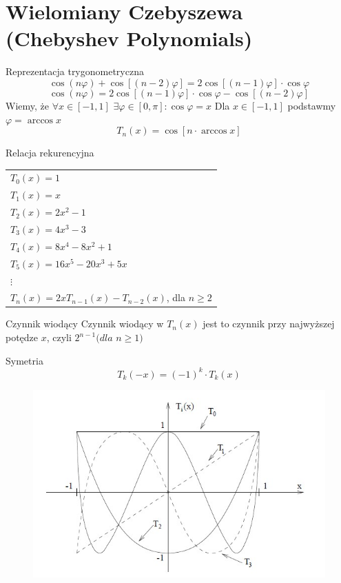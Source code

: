 \section{Wielomiany Czebyszewa (Chebyshev Polynomials)}
\begin{frame}{Reprezentacja trygonometryczna}
	$$\cos(n\varphi)+\cos[(n-2)\varphi] = 2\cos[(n-1)\varphi] \cdot \cos \varphi$$
    $$\cos(n\varphi) = 2\cos[(n-1)\varphi] \cdot \cos \varphi - \cos[(n-2)\varphi]$$
    Wiemy, że $\forall x \in [-1,1]$ $\exists \varphi \in [0,\pi]: \cos \varphi = x$ \newline
    Dla $x \in [-1,1]$ podstawmy $\varphi=\arccos x$
    $$T_n(x) = \cos[n \cdot \arccos x]$$
\end{frame}
\begin{frame}{Relacja rekurencyjna}
	\begin{tabular}{l}
		$T_0(x) = 1$ \\
        $T_1(x) = x$ \\
        $T_2(x) = 2x^2-1$ \\
        $T_3(x) = 4x^3-3$ \\
        $T_4(x) = 8x^4-8x^2+1$ \\
        $T_5(x) = 16x^5-20x^3+5x$ \\
        $\vdots$ \\
        $T_n(x) = 2xT_{n-1}(x) - T_{n-2}(x)$, dla $n\geqslant2$
	\end{tabular}
    
    \begin{block}{Czynnik wiodący}
    	Czynnik wiodący w $T_n(x)$ jest to czynnik przy najwyższej potędze $x$, czyli $2^{n-1} (dla$ $n\geqslant1)$
    \end{block}
\end{frame}
\begin{frame}{Symetria}
	$$T_k(-x)=(-1)^k \cdot T_k(x)$$
    \begin{figure}
		\includegraphics[height=0.75\textheight]{img/5/symetria.jpg}
	\end{figure}
\end{frame}
